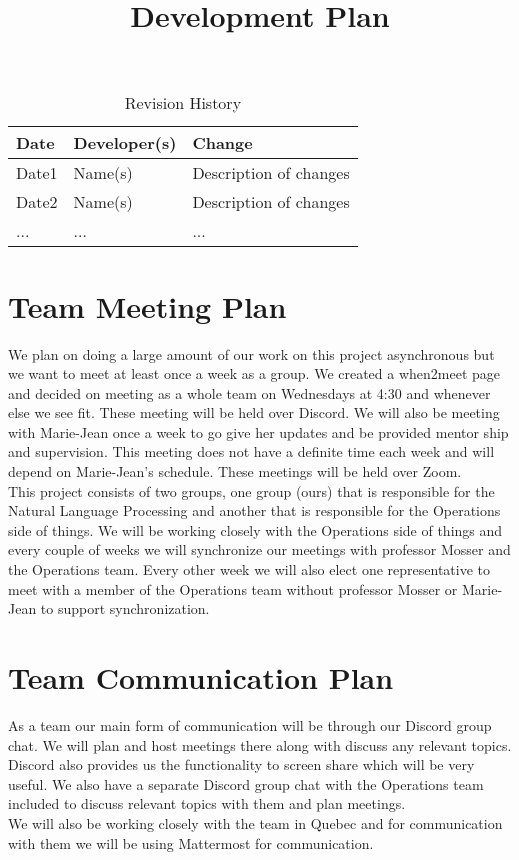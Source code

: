 \documentclass{article}
\title{Development Plan\\\progname}
\author{\authname}
\date{}
\begin{document}
\maketitle

\begin{table}[hp]
\caption{Revision History} \label{TblRevisionHistory}
\begin{tabularx}{\textwidth}{llX}
\toprule
\textbf{Date} & \textbf{Developer(s)} & \textbf{Change}\\
\midrule
Date1 & Name(s) & Description of changes\\
Date2 & Name(s) & Description of changes\\
... & ... & ...\\
\bottomrule
\end{tabularx}
\end{table}


\section{Team Meeting Plan}

We plan on doing a large amount of our work on this project asynchronous but we want to meet at least once a week as a group. We created a when2meet page and decided on meeting as a whole team on Wednesdays at 4:30 and whenever else we see fit. These meeting will be held over Discord. We will also be meeting with Marie-Jean once a week to go give her updates and be provided mentor ship and supervision. This meeting does not have a definite time each week and will depend on Marie-Jean's schedule. These meetings will be held over Zoom.\\

This project consists of two groups, one group (ours) that is responsible for the Natural Language Processing and another that is responsible for the Operations side of things. We will be working closely with the Operations side of things and every couple of weeks we will synchronize our meetings with professor Mosser and the Operations team. Every other week we will also elect one representative to meet with a member of the Operations team without professor Mosser or Marie-Jean to support synchronization.
\section{Team Communication Plan}

As a team our main form of communication will be through our Discord group chat. We will plan and host meetings there along with discuss any relevant topics. Discord also provides us the functionality to screen share which will be very useful. We also have a separate Discord group chat with the Operations team included to discuss relevant topics with them and plan meetings.\\
We will also be working closely with the team in Quebec and for communication with them we will be using Mattermost for communication.
\end{document}
